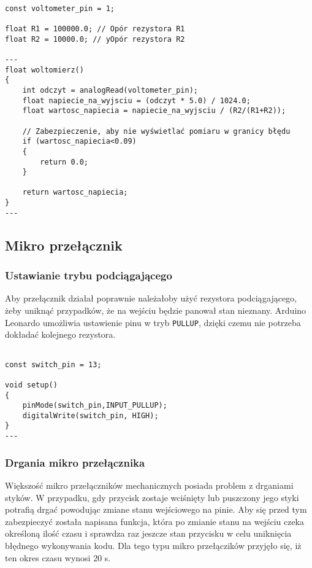 \begin{lstlisting}[label=list:code_thr,caption=Obliczanie aktualnego napięcia,
basicstyle=\footnotesize\ttfamily]

const voltometer_pin = 1;

float R1 = 100000.0; // Opór rezystora R1
float R2 = 10000.0; // yOpór rezystora R2

---
float woltomierz()
{
    int odczyt = analogRead(voltometer_pin);
    float napiecie_na_wyjsciu = (odczyt * 5.0) / 1024.0;
    float wartosc_napiecia = napiecie_na_wyjsciu / (R2/(R1+R2));
    
    // Zabezpieczenie, aby nie wyświetlać pomiaru w granicy błędu
    if (wartosc_napiecia<0.09)
    {
    	return 0.0;
    }
    
    return wartosc_napiecia;
}
---
\end{lstlisting}


\subsection{Mikro przełącznik}

\subsubsection{Ustawianie trybu podciągającego}

Aby przełącznik działał poprawnie należałoby użyć rezystora podciągającego, żeby uniknąć przypadków, że na wejściu będzie panował stan nieznany. Arduino Leonardo umożliwia ustawienie pinu w tryb \texttt{PULLUP}, dzięki czemu nie potrzeba dokładać kolejnego rezystora. 
\begin{lstlisting}[label=list:code_pullup,caption=Ustawianie pinu switcha w tryb PULLUP,
basicstyle=\footnotesize\ttfamily]

const switch_pin = 13;

void setup()
{
    pinMode(switch_pin,INPUT_PULLUP);
    digitalWrite(switch_pin, HIGH);
}
---
\end{lstlisting}

\subsubsection{Drgania mikro przełącznika}
Większość mikro przełączników mechanicznych posiada problem z drganiami styków. W przypadku, gdy przycisk zostaje wciśnięty lub puszczony jego styki potrafią drgać powodując zmiane stanu wejściowego na pinie. Aby się przed tym zabezpieczyć została napisana funkcja, która po zmianie stanu na wejściu czeka określoną ilość czasu i sprawdza raz jeszcze stan przycisku w celu uniknięcia błędnego wykonywania kodu. Dla tego typu mikro przełączików przyjęło się, iż ten okres czasu wynosi 20 \mu s.\\


